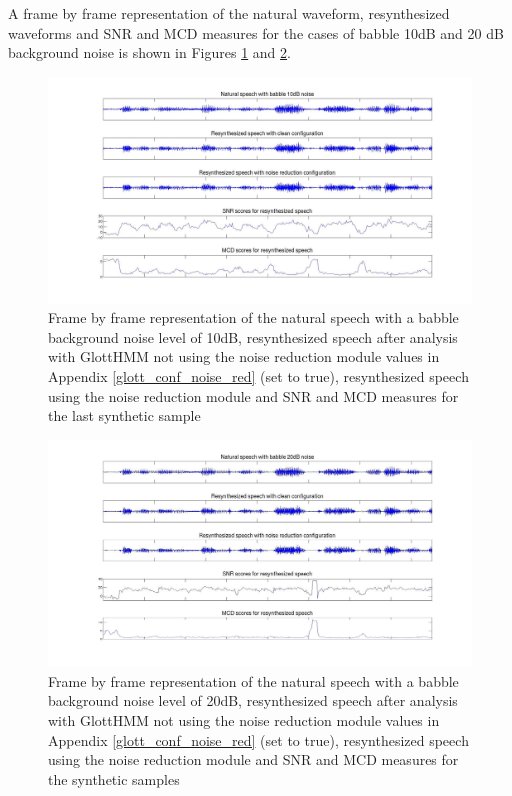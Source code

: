 A frame by frame representation of the natural waveform, resynthesized waveforms and SNR and MCD measures for the cases of babble 10dB and 20 dB background noise is shown in Figures \ref{fig:frame_by_frame_babble10} and \ref{fig:frame_by_frame_babble20}.

\begin{figure}[!htb]
\begin{adjustwidth}{-2.6cm}{}
\includegraphics[width=1.3\textwidth]{images/babble10_frame_by_frame.jpg}
\end{adjustwidth}
\caption{Frame by frame representation of the natural speech with a babble background noise level of 10dB, resynthesized speech after analysis with GlottHMM not using the noise reduction module values in Appendix \ref{glott_conf_noise_red} (set to true), resynthesized speech using the noise reduction module and SNR and MCD measures for the last synthetic sample}
\label{fig:frame_by_frame_babble10}
\end{figure}

\begin{figure}[!hb]
\begin{adjustwidth}{-2.6cm}{}
\includegraphics[width=1.3\textwidth]{images/babble20_frame_by_frame.pdf}
\end{adjustwidth}
\caption{Frame by frame representation of the natural speech with a babble background noise level of 20dB, resynthesized speech after analysis with GlottHMM not using the noise reduction module values in Appendix \ref{glott_conf_noise_red} (set to true), resynthesized speech using the noise reduction module and SNR and MCD measures for the synthetic samples}
\label{fig:frame_by_frame_babble20}
\end{figure}

